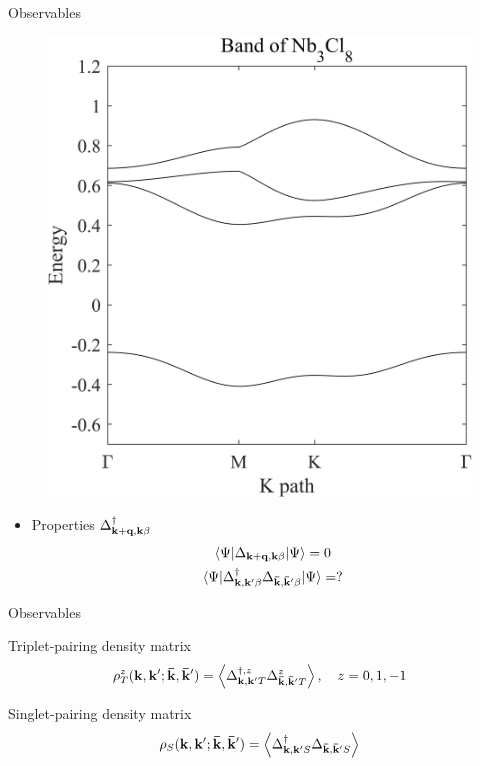 \documentclass{beamer}
\begin{document}
\begin{frame}{Observables}
	\begin{multicols}{2}
		\begin{figure}[H]
			\includegraphics[width=1\linewidth]{figures/band.png}
		\end{figure}
		\newpage
		\begin{itemize}
			\item Properties $\Delta^\dagger_{\vb{k+q,k}\beta} $
			\begin{gather*}
				\expval{\Delta_{\vb{k+q,k}\beta}}{\Psi}=0\\
				\expval{\Delta^\dagger_{\vb{k,k'}\beta}\Delta_{\vb{\bar{k},\bar{k}'}\beta}}{\Psi}=?
			\end{gather*}
		\end{itemize}
	\end{multicols}
\end{frame}

\begin{frame}{Observables}
	\begin{definition}{Triplet-pairing density matrix}
		\begin{equation*}
			\rho_T^z(\vb{k,k'};\vb{\bar{k},\bar{k}'})=\expval{\Delta^{\dagger,z}_{\vb{k,k'}T}\Delta^{z}_{\vb{\bar{k},\bar{k}'}T}},\quad z = 0,1,-1
		\end{equation*}
	\end{definition}
	\begin{definition}{Singlet-pairing density matrix}
		\begin{equation*}
			\rho_S(\vb{k,k'};\vb{\bar{k},\bar{k}'})=\expval{\Delta^\dagger_{\vb{k,k'}S}\Delta_{\vb{\bar{k},\bar{k}'}S}}
		\end{equation*}
	\end{definition}
\end{frame}
\end{document}
